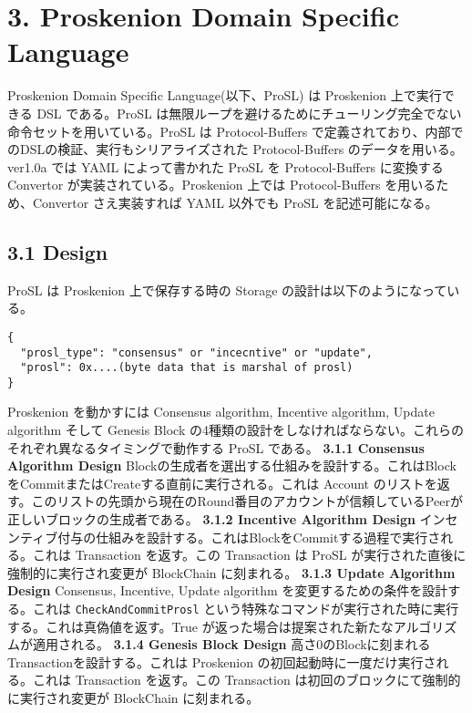 \hypertarget{proskenion-domain-specific-language}{%
\section{3. Proskenion Domain Specific
Language}\label{proskenion-domain-specific-language}}

Proskenion Domain Specific Language(以下、ProSL) は Proskenion
上で実行できる DSL である。ProSL
は無限ループを避けるためにチューリング完全でない命令セットを用いている。ProSL
は Protocol-Buffers
で定義されており、内部でのDSLの検証、実行もシリアライズされた
Protocol-Buffers のデータを用いる。ver1.0a では YAML によって書かれた
ProSL を Protocol-Buffers に変換する Convertor
が実装されている。Proskenion 上では Protocol-Buffers
を用いるため、Convertor さえ実装すれば YAML 以外でも ProSL
を記述可能になる。

\hypertarget{design}{%
\subsection{3.1 Design}\label{design}}

ProSL は Proskenion 上で保存する時の Storage
の設計は以下のようになっている。

\begin{verbatim}
{
  "prosl_type": "consensus" or "incecntive" or "update",
  "prosl": 0x....(byte data that is marshal of prosl)
}
\end{verbatim}

Proskenion を動かすには Consensus algorithm, Incentive algorithm, Update
algorithm そして Genesis Block
の4種類の設計をしなければならない。これらのそれぞれ異なるタイミングで動作する
ProSL である。 \textbf{3.1.1 Consensus Algorithm Design}
Blockの生成者を選出する仕組みを設計する。これはBlockをCommitまたはCreateする直前に実行される。これは
Account
のリストを返す。このリストの先頭から現在のRound番目のアカウントが信頼しているPeerが正しいブロックの生成者である。
\textbf{3.1.2 Incentive Algorithm Design}
インセンティブ付与の仕組みを設計する。これはBlockをCommitする過程で実行される。これは
Transaction を返す。この Transaction は ProSL
が実行された直後に強制的に実行され変更が BlockChain に刻まれる。
\textbf{3.1.3 Update Algorithm Design} Consensus, Incentive, Update
algorithm を変更するための条件を設計する。これは
\texttt{CheckAndCommitProsl}
という特殊なコマンドが実行された時に実行する。これは真偽値を返す。True
が返った場合は提案された新たなアルゴリズムが適用される。 \textbf{3.1.4
Genesis Block Design}
高さ0のBlockに刻まれるTransactionを設計する。これは Proskenion
の初回起動時に一度だけ実行される。これは Transaction を返す。この
Transaction は初回のブロックにて強制的に実行され変更が BlockChain
に刻まれる。

